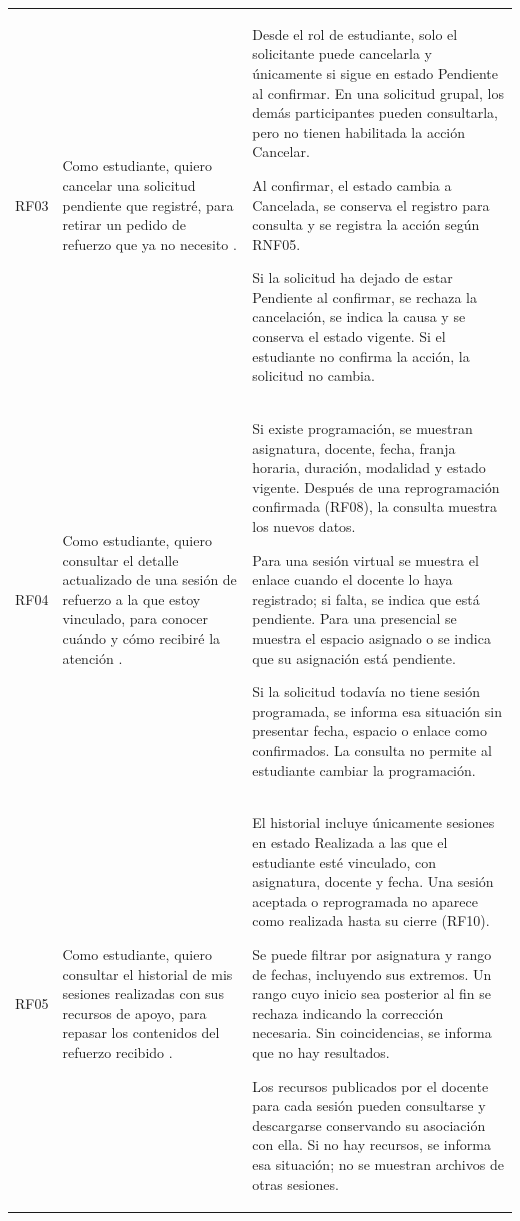 \begin{longtable}{@{}p{}p{}p{}@{}}
RF03 &
Como estudiante, quiero cancelar una solicitud pendiente
que registré, para retirar un pedido de refuerzo
que ya no necesito \cite{SGRA-documentacion-original}. &
Desde el rol de estudiante, solo el solicitante puede cancelarla y
únicamente si sigue en estado Pendiente al confirmar.
En una solicitud grupal, los demás participantes pueden
consultarla, pero no tienen habilitada la acción Cancelar.
\par\smallskip\noindent
Al confirmar, el estado cambia a Cancelada, se conserva
el registro para consulta y se registra la acción
según RNF05.
\par\smallskip\noindent
Si la solicitud ha dejado de estar Pendiente al confirmar,
se rechaza la cancelación, se indica
la causa y se conserva el estado vigente.
Si el estudiante no confirma la acción, la solicitud no cambia. \\

RF04 &
Como estudiante, quiero consultar el detalle actualizado
de una sesión de refuerzo a la que estoy vinculado,
para conocer cuándo y cómo recibiré la atención
\cite{Ponce2025-Entrevista,SGRA-documentacion-original}. &
Si existe programación, se muestran asignatura, docente,
fecha, franja horaria, duración, modalidad y estado vigente.
Después de una reprogramación confirmada (RF08),
la consulta muestra los nuevos datos.
\par\smallskip\noindent
Para una sesión virtual se muestra el enlace cuando el
docente lo haya registrado; si falta, se indica que está
pendiente. Para una presencial se muestra el espacio
asignado o se indica que su asignación está pendiente.
\par\smallskip\noindent
Si la solicitud todavía no tiene sesión programada,
se informa esa situación sin presentar fecha, espacio
o enlace como confirmados. La consulta no permite
al estudiante cambiar la programación. \\

RF05 &
Como estudiante, quiero consultar el historial de mis
sesiones realizadas con sus recursos de apoyo,
para repasar los contenidos del refuerzo recibido
\cite{Daz2025,SGRA-documentacion-original}. &
El historial incluye únicamente sesiones en estado Realizada
a las que el estudiante esté vinculado, con asignatura,
docente y fecha. Una sesión aceptada o reprogramada
no aparece como realizada hasta su cierre (RF10).
\par\smallskip\noindent
Se puede filtrar por asignatura y rango de fechas,
incluyendo sus extremos. Un rango cuyo inicio sea posterior
al fin se rechaza indicando la corrección necesaria.
Sin coincidencias, se informa que no hay resultados.
\par\smallskip\noindent
Los recursos publicados por el docente para cada sesión
pueden consultarse y descargarse conservando su asociación
con ella. Si no hay recursos, se informa esa situación;
no se muestran archivos de otras sesiones. \\


\end{longtable}
